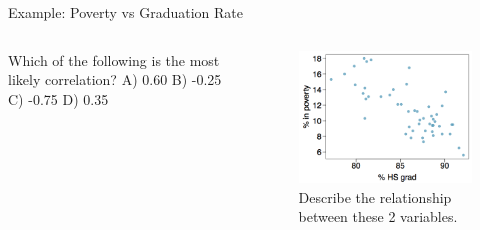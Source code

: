 \documentclass[
  ignorenonframetext,
]{beamer}
\begin{document}
\begin{frame}{Example: Poverty vs Graduation Rate}
\label{example-poverty-vs-graduation-rate-2}
\begin{columns}[T]
\begin{column}{0.48\textwidth}
Which of the following is the most likely correlation? A) 0.60 B) -0.25
C) -0.75 D) 0.35
\end{column}

\begin{column}{0.48\textwidth}
\begin{figure}[H]

{\centering \includegraphics{class31_files/mediabag/poverty-vs-grad-rate.png}

}

\caption{Describe the relationship between these 2 variables.}

\end{figure}%
\end{column}
\end{columns}
\end{frame}
\end{document}

